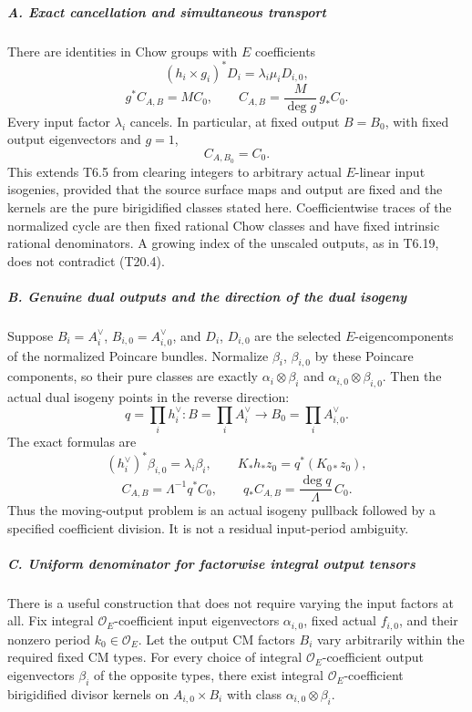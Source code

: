 \documentclass[11pt,a4paper]{article}
\theoremstyle{definition}
\begin{document}
\subparagraph{A. Exact cancellation and simultaneous transport}\label{a.-exact-cancellation-and-simultaneous-transport}

There are identities in Chow groups with \(E\) coefficients \[
 (h_i\times g_i)^*D_i=\lambda_i\mu_iD_{i,0},
 \tag{T20.2}
\] \[
 g^*C_{A,B}=M C_0,
 \qquad
 C_{A,B}=\frac{M}{\deg g}\,g_*C_0.
 \tag{T20.3}
\] Every input factor \(\lambda_i\) cancels. In particular, at fixed output \(B=B_0\), with fixed output eigenvectors and \(g=1\), \[
 C_{A,B_0}=C_0.
 \tag{T20.4}
\] This extends T6.5 from clearing integers to arbitrary actual \(E\)-linear input isogenies, provided that the source surface maps and output are fixed and the kernels are the pure birigidified classes stated here. Coefficientwise traces of the normalized cycle are then fixed rational Chow classes and have fixed intrinsic rational denominators. A growing index of the unscaled outputs, as in T6.19, does not contradict (T20.4).

\subparagraph{B. Genuine dual outputs and the direction of the dual isogeny}\label{b.-genuine-dual-outputs-and-the-direction-of-the-dual-isogeny}

Suppose \(B_i=A_i^\vee\), \(B_{i,0}=A_{i,0}^\vee\), and \(D_i\), \(D_{i,0}\) are the selected \(E\)-eigencomponents of the normalized Poincare bundles. Normalize \(\beta_i\), \(\beta_{i,0}\) by these Poincare components, so their pure classes are exactly \(\alpha_i\otimes\beta_i\) and \(\alpha_{i,0}\otimes\beta_{i,0}\). Then the actual dual isogeny points in the reverse direction: \[
 q=\prod_i h_i^\vee:B=\prod_iA_i^\vee
                      \longrightarrow B_0=\prod_iA_{i,0}^\vee.
\] The exact formulas are \[
 (h_i^\vee)^*\beta_{i,0}=\lambda_i\beta_i,
 \qquad
 K_*h_*z_0=q^*(K_{0*}z_0),
 \tag{T20.5}
\] \[
 C_{A,B}=\Lambda^{-1}q^*C_0,
 \qquad
 q_*C_{A,B}=\frac{\deg q}{\Lambda}\,C_0.
 \tag{T20.6}
\] Thus the moving-output problem is an actual isogeny pullback followed by a specified coefficient division. It is not a residual input-period ambiguity.

\subparagraph{C. Uniform denominator for factorwise integral output tensors}\label{c.-uniform-denominator-for-factorwise-integral-output-tensors}

There is a useful construction that does not require varying the input factors at all. Fix integral \(\mathcal O_E\)-coefficient input eigenvectors \(\alpha_{i,0}\), fixed actual \(f_{i,0}\), and their nonzero period \(k_0\in\mathcal O_E\). Let the output CM factors \(B_i\) vary arbitrarily within the required fixed CM types. For every choice of integral \(\mathcal O_E\)-coefficient output eigenvectors \(\beta_i\) of the opposite types, there exist integral \(\mathcal O_E\)-coefficient birigidified divisor kernels on \(A_{i,0}\times B_i\) with class \(\alpha_{i,0}\otimes\beta_i\).
\end{document}
